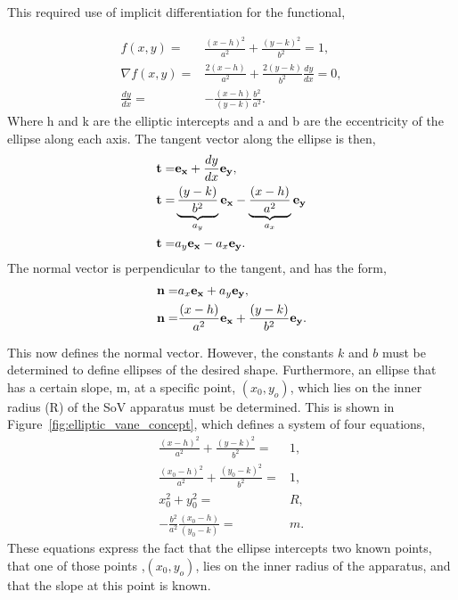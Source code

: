 This required use of implicit differentiation for the functional,

\begin{eqnarray}
 f(x,y)  =& \frac{(x-h)^2}{a^2} + \frac{(y-k)^2}{b^2} = 1, \\
 \nabla f(x,y) =& \frac{2 (x-h)}{a^2} + \frac{2 (y-k)}{b^2}\frac{dy}{dx} = 0, \\
 \frac{dy}{dx} =& -\frac{(x-h)}{(y-k)}\frac{b^2}{a^2}. 
\end{eqnarray}
Where h and k are the elliptic intercepts and a and b are the
eccentricity of the ellipse along each axis. The tangent vector along
the ellipse is then,  
\begin{eqnarray}
 {\bf t} =& {\bf e_x} + \frac{dy}{dx}{\bf e_y}, \\
 {\bf t} =& \underbrace{\frac{(y-k)}{b^2}}_{a_y} {\bf e_x} -
  \underbrace{\frac{(x-h)}{a^2}}_{a_x}{\bf e_y} \\
 {\bf t} =& {a_y} {\bf e_x} - {a_x}{\bf e_y}. 
\end{eqnarray}
%
The normal vector is perpendicular to the tangent, and has the form, 
\begin{eqnarray}
 {\bf n} =& {a_x} {\bf e_x} + {a_y}{\bf e_y}, \label{eqn:a_x}\\
 {\bf n} =& \frac{(x-h)}{a^2} {\bf e_x} + \frac{(y-k)}{b^2} {\bf e_y}.
\end{eqnarray}

This now defines the normal vector.
However, the constants $k$ and $b$ must be determined to 
define ellipses of the desired shape. 
Furthermore, an ellipse that has a certain slope, m, 
at a specific point,  $(x_0,y_o)$, which lies on the inner
radius (R) of the SoV apparatus must be determined. This is shown in
Figure~\ref{fig:elliptic_vane_concept}, which defines a system of four
equations,
\begin{eqnarray}
 \frac{(x-h)^2}{a^2} + \frac{(y-k)^2}{b^2} =& 1, \label{eq:ell1}\\
 \frac{(x_0-h)^2}{a^2} + \frac{(y_0-k)^2}{b^2} =& 1, \label{eq:ell2}  \\
 x_0^2 + y_0^2 =& R, \label{eq:ell3} \\
 -\frac{b^2}{a^2}\frac{(x_0-h)}{(y_0-k)} =& m. \label{eq:ell4} 
\end{eqnarray}
These equations express the fact that the ellipse intercepts two known
points, that one of those points ,$(x_0,y_o)$, lies 
on the inner radius of the apparatus, and that the slope at 
this point is known. 


